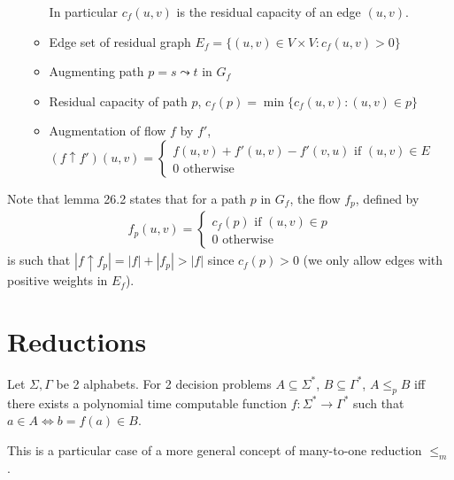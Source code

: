 \documentclass{article}
\begin{document}
\begin{itemize}
\begin{itemize}
		In particular $c_f(u,v)$ is the residual capacity of an edge $(u,v)$.
		\item Edge set of residual graph $E_f=\{(u,v)\in V\times V : c_f(u,v)>0\}$
		\item Augmenting path $p=s\leadsto t$ in $G_f$
		\item Residual capacity of path $p$, $c_f(p)=\min \{c_f(u,v) : (u,v)\in p\}$
		\item Augmentation of flow $f$ by $f'$, 
		$(f\uparrow f')(u,v)=\begin{cases}
			f(u,v) + f'(u,v) - f'(v,u) \text{ if } (u,v)\in E\\
			0 \text{ otherwise}		
		\end{cases}$
	\end{itemize}
\end{itemize}

Note that lemma 26.2 states that for a path $p$ in $G_f$, the flow  $f_p$, defined by
\begin{align*}
	f_p(u,v)=\begin{cases}
		c_f(p) \text{ if } (u,v)\in p\\
		0 \text{ otherwise}
	\end{cases}
\end{align*}
is such that $|f\uparrow f_p| = |f| + |f_p| > |f|$ since $c_f(p)>0$ (we only allow edges with positive weights in $E_f$).

\section{Reductions}
Let $\Sigma, \Gamma$ be 2 alphabets. For 2 decision problems $A\subseteq \Sigma^*$, $B\subseteq \Gamma^*$, $A\leq_p B$ iff there exists a polynomial time computable function $f:\Sigma^*\rightarrow \Gamma^*$ such that $a\in A\iff b=f(a)\in B$.

This is a particular case of a more general concept of many-to-one reduction $\leq_m$.
\end{document}

